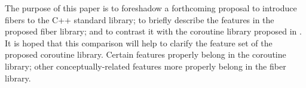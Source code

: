 The purpose of this paper is to foreshadow a forthcoming proposal to introduce
fibers to the C++ standard library; to briefly describe the features in the
proposed fiber library; and to contrast it with the coroutine library proposed
in \docr.\\
\newline
It is hoped that this comparison will help to clarify the feature set of the
proposed coroutine library. Certain features properly belong in the coroutine
library; other conceptually-related features more properly belong in the fiber
library.
